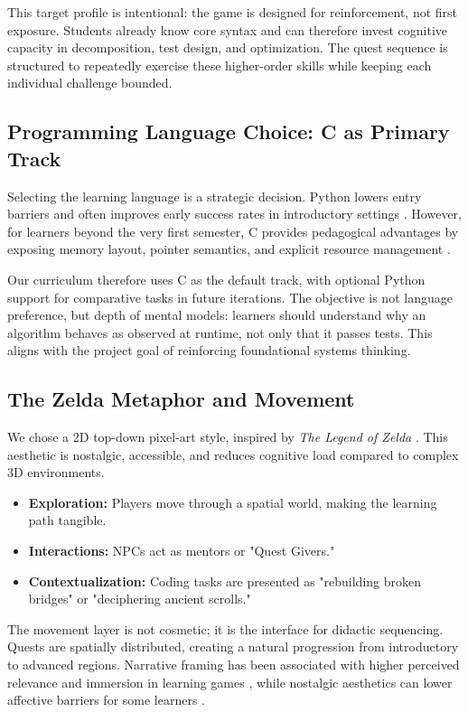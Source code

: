 \documentclass[a4paper, UKenglish, cleveref, autoref, thm-restate]{oasics-v2021}
\begin{document}
This target profile is intentional: the game is designed for reinforcement, not first exposure. Students already know core syntax and can therefore invest cognitive capacity in decomposition, test design, and optimization. The quest sequence is structured to repeatedly exercise these higher-order skills while keeping each individual challenge bounded.

\subsection{Programming Language Choice: C as Primary Track}
Selecting the learning language is a strategic decision. Python lowers entry barriers and often improves early success rates in introductory settings \cite{wainer2018pythonc}. However, for learners beyond the very first semester, C provides pedagogical advantages by exposing memory layout, pointer semantics, and explicit resource management \cite{balreira2022pythonc}.

Our curriculum therefore uses C as the default track, with optional Python support for comparative tasks in future iterations. The objective is not language preference, but depth of mental models: learners should understand why an algorithm behaves as observed at runtime, not only that it passes tests. This aligns with the project goal of reinforcing foundational systems thinking.

\subsection{The Zelda Metaphor and Movement}
We chose a 2D top-down pixel-art style, inspired by \textit{The Legend of Zelda} \cite{nintendo1986zelda}. This aesthetic is nostalgic, accessible, and reduces cognitive load compared to complex 3D environments.
\begin{itemize}
    \item \textbf{Exploration:} Players move through a spatial world, making the learning path tangible.
    \item \textbf{Interactions:} NPCs act as mentors or "Quest Givers."
    \item \textbf{Contextualization:} Coding tasks are presented as "rebuilding broken bridges" or "deciphering ancient scrolls."
\end{itemize}

The movement layer is not cosmetic; it is the interface for didactic sequencing. Quests are spatially distributed, creating a natural progression from introductory to advanced regions. Narrative framing has been associated with higher perceived relevance and immersion in learning games \cite{jarrah2024storytelling}, while nostalgic aesthetics can lower affective barriers for some learners \cite{makai2018nostalgia}.
\end{document}
